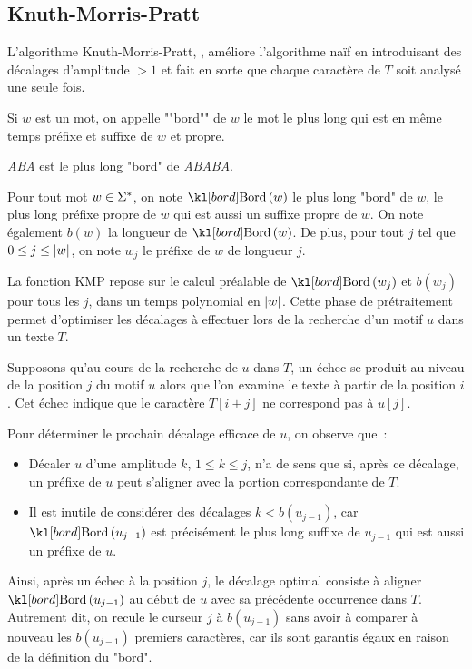 \subsection{Knuth-Morris-Pratt}


L'algorithme Knuth-Morris-Pratt, \cite{kmp}, améliore l'algorithme naïf en introduisant des décalages d'amplitude
$> 1$ et fait en sorte que chaque caractère de $T$ soit analysé une seule fois.

\begin{definition}
	Si $w$ est un mot, on appelle ""bord"" de $w$ le mot le plus long qui est en même temps préfixe et suffixe de $w$ et propre.
\end{definition}

\begin{exemple}
	\emph{ABA} est le plus long "bord" de \emph{ABABA}.
\end{exemple}


Pour tout mot $w \in \Sigma^{*}$, on note $\Bord w$ le plus long "bord" de $w$,
\cad le plus long préfixe propre de  $w$ qui est aussi un suffixe propre de $w$.
On note également $b(w)$ la longueur de $\Bord w$. De plus, pour tout $j$ tel que
$0 \leq j \leq |w| $, on note $w_j$ le préfixe de $w$ de longueur $j$.

La fonction KMP repose sur le calcul préalable de $\Bord{w_j}$ et  $b(w_j)$ pour tous les
$j$, dans un temps polynomial en $|w|$. Cette phase de prétraitement permet d’optimiser les décalages
à effectuer lors de la recherche d’un motif $u$ dans un texte $T$.

Supposons qu’au cours de la recherche de $u$ dans $T$, un échec se produit au niveau de la position $j$
du motif $u$ alors que l'on examine le texte à partir de la position $i$. Cet échec indique que le caractère
$T[i+j]$ ne correspond pas à $u[j]$.

Pour déterminer le prochain décalage efficace de $u$, on observe que :
\begin{itemize}
	\item Décaler $u$ d’une amplitude $k$, $1 \leq k \leq j$, n’a de sens que si, après ce décalage,
	      un préfixe de $u$ peut s’aligner avec la portion correspondante de $T$.
	\item Il est inutile de considérer des décalages $k < b(u_{j-1})$, car $\Bord{u_{j-1}}$
	      est précisément le plus long suffixe de $u_{j-1}$ qui est aussi un préfixe de $u$.
\end{itemize}

Ainsi, après un échec à la position $j$, le décalage optimal consiste à aligner $\Bord{u_{j-1}}$
au début de $u$ avec sa précédente occurrence dans $T$. Autrement dit, on recule le curseur
$j$ à $b(u_{j-1})$ sans avoir à comparer à nouveau les $b(u_{j-1})$ premiers caractères,
car ils sont garantis égaux en raison de la définition du "bord".

